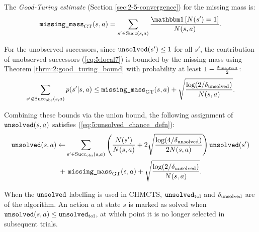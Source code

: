     The \textit{Good-Turing estimate} (Section \ref{sec:2-5-convergence}) for the missing mass is:
    \begin{align}
        \goodturingestimate(s,a) 
            = \sum_{s'\in\suc{s}{a}}\frac{\one\left[N(s')=1\right]}{N(s,a)}.
    \end{align}

    For the unobserved successors, since ${\textnormal{\texttt{unsolved}}}(s')\leq 1$ for all $s'$, the contribution of unobserved successors (\ref{eq:5:local7}) is bounded by the missing mass using Theorem \ref{thrm:2:good_turing_bound} with probability at least $1-\frac{{\delta_{\textnormal{unsolved}}}}{2}$:
    \begin{align}
        \sum_{s'\not\in{\textnormal{Succ}_{\textnormal{obs}}(s,a)}} p(s'|s,a) 
        \leq {\textnormal{\texttt{missing\_mass}}_{\textnormal{GT}}}(s,a) + \sqrt{\frac{\log(2/{\delta_{\textnormal{unsolved}}})}{N(s,a)}}.
    \end{align}
    
    Combining these bounds via the union bound, the following assignment of ${\textnormal{\texttt{unsolved}}}(s,a)$ satisfies (\ref{eq:5:unsolved_chance_defn}):
    \begin{align}
        {\textnormal{\texttt{unsolved}}}(s,a) \leftarrow &
            \sum_{s'\in{\textnormal{Succ}_{\textnormal{obs}}(s,a)}} 
            \left(\frac{N(s')}{N(s,a)} + 
            2\sqrt{\frac{\log(4/{\delta_{\textnormal{unsolved}}})}{2N(s,a)}}\right){\textnormal{\texttt{unsolved}}}(s') \nonumber \\
            + &\ {\textnormal{\texttt{missing\_mass}}_{\textnormal{GT}}}(s,a) + \sqrt{\frac{\log(2/{\delta_{\textnormal{unsolved}}})}{N(s,a)}}.
            \label{eq:5:solved_value}
    \end{align}
    
    When the ${\textnormal{\texttt{unsolved}}}$ labelling is used in CHMCTS, ${\textnormal{\texttt{unsolved}}_{\textnormal{tol}}}$ and ${\delta_{\textnormal{unsolved}}}$ are  of the algorithm. An action $a$ at state $s$ is marked as solved when ${\textnormal{\texttt{unsolved}}}(s,a) \leq {\textnormal{\texttt{unsolved}}_{\textnormal{tol}}}$, at which point it is no longer selected in subsequent trials.


